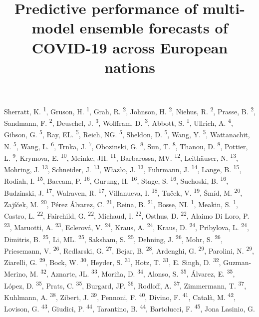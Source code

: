 \documentclass[
]{article}
\title{Predictive performance of multi-model ensemble forecasts of COVID-19 across European nations}
\author{}
\date{\vspace{-2.5em}}
\begin{document}
\maketitle

Sherratt, K. \textsuperscript{1}, Gruson, H. \textsuperscript{1}, Grah, R. \textsuperscript{2}, Johnson, H. \textsuperscript{2}, Niehus, R. \textsuperscript{2}, Prasse, B. \textsuperscript{2}, Sandmann, F. \textsuperscript{2}, Deuschel, J. \textsuperscript{3}, Wolffram, D. \textsuperscript{3}, Abbott, S. \textsuperscript{1}, Ullrich, A. \textsuperscript{4}, Gibson, G. \textsuperscript{5}, Ray, EL. \textsuperscript{5}, Reich, NG. \textsuperscript{5}, Sheldon, D. \textsuperscript{5}, Wang, Y. \textsuperscript{5}, Wattanachit, N. \textsuperscript{5}, Wang, L. \textsuperscript{6}, Trnka, J. \textsuperscript{7}, Obozinski, G. \textsuperscript{8}, Sun, T. \textsuperscript{8}, Thanou, D. \textsuperscript{8}, Pottier, L. \textsuperscript{9}, Krymova, E. \textsuperscript{10}, Meinke, JH. \textsuperscript{11}, Barbarossa, MV. \textsuperscript{12}, Leithäuser, N. \textsuperscript{13}, Mohring, J. \textsuperscript{13}, Schneider, J. \textsuperscript{13}, Włazło, J. \textsuperscript{13}, Fuhrmann, J. \textsuperscript{14}, Lange, B. \textsuperscript{15}, Rodiah, I. \textsuperscript{15}, Baccam, P. \textsuperscript{16}, Gurung, H. \textsuperscript{16}, Stage, S. \textsuperscript{16}, Suchoski, B. \textsuperscript{16}, Budzinski, J. \textsuperscript{17}, Walraven, R. \textsuperscript{17}, Villanueva, I. \textsuperscript{18}, Tuček, V. \textsuperscript{19}, Šmíd, M. \textsuperscript{20}, Zajíček, M. \textsuperscript{20}, Pérez Álvarez, C. \textsuperscript{21}, Reina, B. \textsuperscript{21}, Bosse, NI. \textsuperscript{1}, Meakin, S. \textsuperscript{1}, Castro, L. \textsuperscript{22}, Fairchild, G. \textsuperscript{22}, Michaud, I. \textsuperscript{22}, Osthus, D. \textsuperscript{22}, Alaimo Di Loro, P. \textsuperscript{23}, Maruotti, A. \textsuperscript{23}, Eclerová, V. \textsuperscript{24}, Kraus, A. \textsuperscript{24}, Kraus, D. \textsuperscript{24}, Pribylova, L. \textsuperscript{24}, Dimitris, B. \textsuperscript{25}, Li, ML. \textsuperscript{25}, Saksham, S. \textsuperscript{25}, Dehning, J. \textsuperscript{26}, Mohr, S. \textsuperscript{26}, Priesemann, V. \textsuperscript{26}, Redlarski, G. \textsuperscript{27}, Bejar, B. \textsuperscript{28}, Ardenghi, G. \textsuperscript{29}, Parolini, N. \textsuperscript{29}, Ziarelli, G. \textsuperscript{29}, Bock, W. \textsuperscript{30}, Heyder, S. \textsuperscript{31}, Hotz, T. \textsuperscript{31}, E. Singh, D. \textsuperscript{32}, Guzman-Merino, M. \textsuperscript{32}, Aznarte, JL. \textsuperscript{33}, Moriña, D. \textsuperscript{34}, Alonso, S. \textsuperscript{35}, Álvarez, E. \textsuperscript{35}, López, D. \textsuperscript{35}, Prats, C. \textsuperscript{35}, Burgard, JP. \textsuperscript{36}, Rodloff, A. \textsuperscript{37}, Zimmermann, T. \textsuperscript{37}, Kuhlmann, A. \textsuperscript{38}, Zibert, J. \textsuperscript{39}, Pennoni, F. \textsuperscript{40}, Divino, F. \textsuperscript{41}, Català, M. \textsuperscript{42}, Lovison, G. \textsuperscript{43}, Giudici, P. \textsuperscript{44}, Tarantino, B. \textsuperscript{44}, Bartolucci, F. \textsuperscript{45}, Jona Lasinio, G. 
\end{document}
